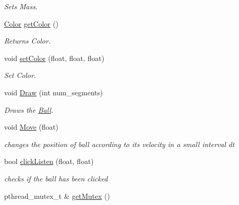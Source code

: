 \begin{DoxyCompactItemize}
\begin{DoxyCompactList}\small\item\em Sets Mass. \end{DoxyCompactList}\item 
\hypertarget{class_ball_a4312896095e89adcbdfaa68f19c1a667}{\hyperlink{global_8h_aae4bd90e8e9fa4cdfa4e10e3494f755b}{Color} \hyperlink{class_ball_a4312896095e89adcbdfaa68f19c1a667}{get\-Color} ()}\label{class_ball_a4312896095e89adcbdfaa68f19c1a667}

\begin{DoxyCompactList}\small\item\em Returns Color. \end{DoxyCompactList}\item 
\hypertarget{class_ball_a3669d9640ee47c76a8956f9695d93963}{void \hyperlink{class_ball_a3669d9640ee47c76a8956f9695d93963}{set\-Color} (float, float, float)}\label{class_ball_a3669d9640ee47c76a8956f9695d93963}

\begin{DoxyCompactList}\small\item\em Set Color. \end{DoxyCompactList}\item 
\hypertarget{class_ball_aebef09ee6cd911ac966e793f830a5634}{void \hyperlink{class_ball_aebef09ee6cd911ac966e793f830a5634}{Draw} (int num\-\_\-segments)}\label{class_ball_aebef09ee6cd911ac966e793f830a5634}

\begin{DoxyCompactList}\small\item\em Draws the \hyperlink{class_ball}{Ball}. \end{DoxyCompactList}\item 
\hypertarget{class_ball_ad4446f9e38aa849eece0fec5d189fe29}{void \hyperlink{class_ball_ad4446f9e38aa849eece0fec5d189fe29}{Move} (float)}\label{class_ball_ad4446f9e38aa849eece0fec5d189fe29}

\begin{DoxyCompactList}\small\item\em changes the position of ball according to its velocity in a small interval dt \end{DoxyCompactList}\item 
\hypertarget{class_ball_a68560a1bdd4ea19d75d579dd1247449b}{bool \hyperlink{class_ball_a68560a1bdd4ea19d75d579dd1247449b}{click\-Listen} (float, float)}\label{class_ball_a68560a1bdd4ea19d75d579dd1247449b}

\begin{DoxyCompactList}\small\item\em checks if the ball has been clicked \end{DoxyCompactList}\item 
\hypertarget{class_ball_a4eeaee1b83ebe0294f51c98c1c2bc389}{pthread\-\_\-mutex\-\_\-t \& \hyperlink{class_ball_a4eeaee1b83ebe0294f51c98c1c2bc389}{get\-Mutex} ()}\label{class_ball_a4eeaee1b83ebe0294f51c98c1c2bc389}


\end{DoxyCompactItemize}
